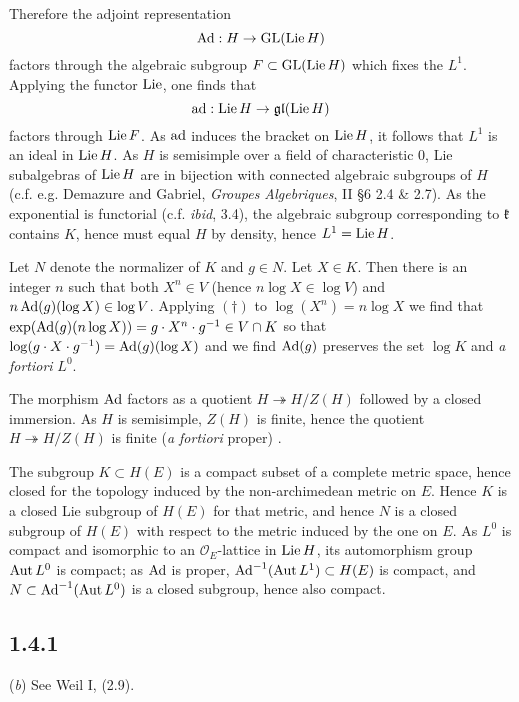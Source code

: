 \documentclass[deligne.tex]{subfiles}
\begin{document}
Therefore the adjoint representation
\begin{equation*}
	\operatorname{Ad}:H\rightarrow\operatorname{GL}(\operatorname{Lie} H)	
\end{equation*}
factors through the algebraic subgroup $F\subset\operatorname{GL}(\operatorname{Lie} H)$ which fixes the
$L^1$. Applying the functor $\operatorname{Lie}$, one finds that
\begin{equation*}
	\operatorname{ad}:\operatorname{Lie} H\rightarrow\mathfrak{gl}(\operatorname{Lie} H)
\end{equation*}
factors through $\operatorname{Lie} F$. As $\operatorname{ad}$ induces the bracket on $\operatorname{Lie} H$, it 
follows that $L^1$ is an ideal in $\operatorname{Lie} H$. As $H$ is semisimple over a 
field of characteristic 0, Lie subalgebras of $\operatorname{Lie} H$ are in bijection with
connected algebraic subgroups of $H$ (c.f. e.g. Demazure and Gabriel, 
\emph{Groupes Algebriques}, II \S6 2.4 \& 2.7).
As the exponential is functorial (c.f. \emph{ibid}, 3.4), the algebraic
subgroup corresponding to $\mathfrak k$ contains $K$, hence must 
equal $H$ by density, hence $L^1=\operatorname{Lie} H$.

Let $N$ denote the normalizer of $K$ and $g\in N$. Let $X\in K$. Then
there is an integer $n$ such that both $X^n\in V$ (hence $n\log X\in\log V$) 
and $n\operatorname{Ad}(g)(\log X)\in\log V$. Applying $(\dagger)$ to $\log(X^n)=n\log X$
we find that $\exp(\operatorname{Ad}(g)(n\log X))=g\cdot X^n\cdot g^{-1}\in V\cap K$
so that $\log(g\cdot X\cdot g^{-1})=\operatorname{Ad}(g)(\log X)$ and we find
$\operatorname{Ad}(g)$ preserves the set $\log K$ and \emph{a fortiori} $L^0$.

The morphism $\operatorname{Ad}$ factors as a quotient $H\twoheadrightarrow H/Z(H)$
followed by a closed immersion. As $H$ is semisimple, $Z(H)$ is finite,
hence the quotient $H\twoheadrightarrow H/Z(H)$ is finite
(\emph{a fortiori} proper) \cite[21.7, 7.15, 5.39]{Milne}.

The subgroup $K\subset H(E)$ is a compact subset of a complete metric
space, hence closed for the topology induced by the non-archimedean metric 
on $E$. Hence $K$ is a closed Lie subgroup of $H(E)$ for that metric, and
hence $N$ is a closed subgroup of $H(E)$ with respect to the metric induced
by the one on $E$. As $L^0$ is compact and isomorphic to an
$\mathscr O_E$-lattice in $\operatorname{Lie} H$, its automorphism group $\operatorname{Aut} L^0$ is 
compact; as $\operatorname{Ad}$ is proper, $\operatorname{Ad}^{-1}(\operatorname{Aut} L^1)\subset H(E)$ is compact, 
and $N\subset\operatorname{Ad}^{-1}(\operatorname{Aut} L^0)$ is a closed subgroup, hence also compact.

\subsection*{1.4.1} (\emph b) See Weil I, (2.9).
\end{document}
